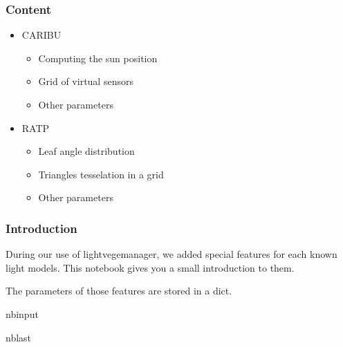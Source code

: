 \documentclass[letterpaper,10pt,english]{sphinxmanual}
\begin{document}
\subsubsection{Content}
\label{\detokenize{lightmodels_functionnalities:Content}}\begin{itemize}
\item {} 
\sphinxAtStartPar
CARIBU
\begin{itemize}
\item {} 
\sphinxAtStartPar
Computing the sun position

\item {} 
\sphinxAtStartPar
Grid of virtual sensors

\item {} 
\sphinxAtStartPar
Other parameters

\end{itemize}

\item {} 
\sphinxAtStartPar
RATP
\begin{itemize}
\item {} 
\sphinxAtStartPar
Leaf angle distribution

\item {} 
\sphinxAtStartPar
Triangles tesselation in a grid

\item {} 
\sphinxAtStartPar
Other parameters

\end{itemize}

\end{itemize}


\subsubsection{Introduction}
\label{\detokenize{lightmodels_functionnalities:Introduction}}
\sphinxAtStartPar
During our use of lightvegemanager, we added special features for each known light models. This notebook gives you a small introduction to them.

\sphinxAtStartPar
The parameters of those features are stored in a dict.

\begin{sphinxuseclass}{nbinput}
\begin{sphinxuseclass}{nblast}
{
\begin{sphinxVerbatim}[commandchars=\\\{\}]
\llap{\color{nbsphinxin}[1]:\,\hspace{\fboxrule}\hspace{\fboxsep}} 
   
   
   
\end{sphinxVerbatim}
}

\end{sphinxuseclass}
\end{sphinxuseclass}
\end{document}
